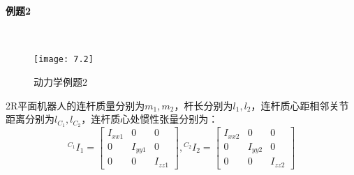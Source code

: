 \documentclass[
12pt, %
a4paper, 
oneside, %
headinclude,footinclude, %
]{scrartcl}
\begin{document}
{\paragraph{例题2}~\\
\begin{minipage}{0.4\textwidth}
\begin{figure}[H]
\centering 
\texttt{[image: 7.2]} 
\caption{动力学例题2}
\end{figure}
\end{minipage}
\begin{minipage}{0.6\textwidth}
\hspace{2em}
2R平面机器人的连杆质量分别为$ m_1, m_2 $，杆长分别为$ l_1, l_2 $，连杆质心距相邻关节距离分别为$ l_{C_1}, l_{C_2} $，连杆质心处惯性张量分别为：
$$ {{}^{C_1}}I_1 = \begin{bmatrix} I_{xx1} & 0 & 0 \\ 0 & I_{yy1} & 0 \\ 0 & 0 & I_{zz1} \end{bmatrix}, {{}^{C_2}}I_2 = \begin{bmatrix}  I_{xx2} & 0 & 0 \\ 0 & I_{yy2} & 0 \\ 0 & 0 & I_{zz2} \end{bmatrix} $$
\end{minipage}
}
\end{document}
